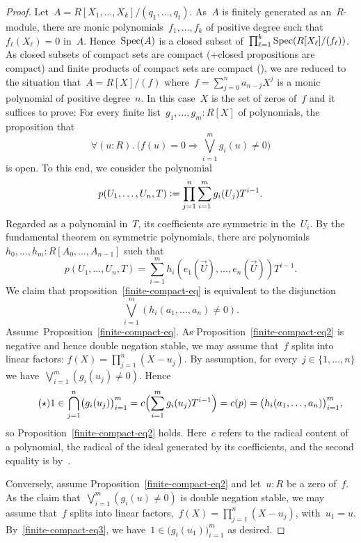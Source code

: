 \begin{proof}Let~$A = R[X_1,\ldots,X_k]/(q_1,\ldots,q_t)$. As~$A$ is finitely
generated as an~$R$-module, there are monic polynomials~$f_1,\ldots,f_k$ of
positive degree such that~$f_\ell(X_\ell) = 0$ in~$A$. Hence~$\operatorname{Spec}(A)$ is a
closed subset of~$\prod_{\ell=1}^k \operatorname{Spec}(R[X_\ell]/(f_\ell))$. As closed
subsets of compact sets are compact (\cite[Lemma 2.0.3]{proper-draft}+closed propositions are compact) and finite products
of compact sets are compact (\cite[Lemma 2.0.3]{proper-draft}), we are reduced to the
situation that~$A = R[X]/(f)$ where~$f = \sum_{j=0}^n a_{n-j} X^j$ is a monic
polynomial of positive degree~$n$. In this case~$X$ is the set of zeros of~$f$
and it suffices to prove: For every finite list~$g_1,\ldots,g_m : R[X]$ of
polynomials, the proposition that
\begin{equation}\label{finite-compact-eq}
  \tag{$\dagger$}
  \forall(u : R).\ \bigl(f(u) = 0 \Rightarrow \bigvee_{i=1}^m g_i(u) \neq 0\bigr)
\end{equation}
is open. To this end, we consider the polynomial
\[ p(U_1,\ldots,U_n,T) \vcentcolon= \prod_{j=1}^n \sum_{i=1}^m g_i(U_j) T^{i-1}. \]
Regarded as a polynomial in~$T$, its coefficients are symmetric in the~$U_i$.
By the fundamental theorem on symmetric polynomials, there are
polynomials~$h_0,\ldots,h_m : R[A_0,\ldots,A_{n-1}]$ such that
\[ p(U_1,\ldots,U_n,T) = \sum_{i=1}^m h_i(e_1(\vec U),\ldots,e_n(\vec U)) T^{i-1}. \]
We claim that proposition~\eqref{finite-compact-eq} is equivalent to the
disjunction
\begin{equation}\label{finite-compact-eq2}
  \tag{$\ddagger$}
  \bigvee_{i=1}^m (h_i(a_1,\ldots,a_n) \neq 0).
\end{equation}
Assume~Proposition~\eqref{finite-compact-eq}. As
Proposition~\eqref{finite-compact-eq2} is negative and hence double
negation stable, we may assume that~$f$ splits into linear factors: $f(X) =
\prod_{j=1}^n (X-u_j)$. By assumption, for every~$j \in \{1,\ldots,n\}$ we
have~$\bigvee_{i=1}^m (g_i(u_j) \neq 0)$. Hence
\begin{equation}\label{finite-compact-eq3}
  \tag{$\star$}
  1 \in \bigcap_{j=1}^n \bigl(g_i(u_j)\bigr)_{i=1}^m = c\Bigl(\sum_{i=1}^m g_i(u_j) T^{i-1}\Bigr) =
  c(p) = \bigl(h_i(a_1,\ldots,a_n)\bigr)_{i=1}^m,
\end{equation}
so Proposition~\eqref{finite-compact-eq2} holds. Here~$c$ refers to the radical
content of a polynomial, the radical of the ideal generated by its
coefficients, and the second equality is
by~\cite[Proposition~1]{banaschewski-vermeulen:radical}.

Conversely, assume Proposition~\eqref{finite-compact-eq2} and let~$u : R$ be a
zero of~$f$. As the claim that~$\bigvee_{i=1}^m (g_i(u) \neq 0)$ is double
negation stable, we may assume that~$f$ splits into linear factors,~$f(X) =
\prod_{j=1}^n (X-u_j)$, with~$u_1 = u$. By~\eqref{finite-compact-eq3}, we
have~$1 \in \bigl(g_i(u_1)\bigr)_{i=1}^m$ as desired.
\end{proof}
